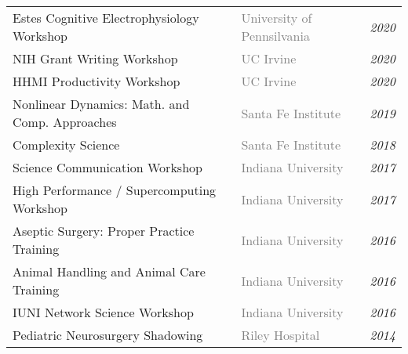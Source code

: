 \documentclass[10pt]{cooperCV2}
\begin{document}
\begin{longtable}{ l l @{\extracolsep{\fill}}  l @{}} 
	 
	Estes Cognitive Electrophysiology Workshop & \textcolor{grey}{University of Pennsilvania}  & \textit{2020} \\
	 
	NIH Grant Writing Workshop & \textcolor{grey}{UC Irvine}  & \textit{2020} \\
	 
	HHMI Productivity Workshop & \textcolor{grey}{UC Irvine}  & \textit{2020} \\
	 
	Nonlinear Dynamics: Math. and Comp. Approaches & \textcolor{grey}{Santa Fe Institute}  & \textit{2019} \\
	 
	Complexity Science & \textcolor{grey}{Santa Fe Institute}  & \textit{2018} \\
	 
	Science Communication Workshop & \textcolor{grey}{Indiana University}  & \textit{2017} \\
	 
	High Performance / Supercomputing Workshop & \textcolor{grey}{Indiana University}  & \textit{2017} \\
	 
	Aseptic Surgery: Proper Practice Training & \textcolor{grey}{Indiana University}  & \textit{2016} \\
	 
	Animal Handling and Animal Care Training & \textcolor{grey}{Indiana University}  & \textit{2016} \\
	 
	IUNI Network Science Workshop & \textcolor{grey}{Indiana University}  & \textit{2016} \\
	 
	Pediatric Neurosurgery Shadowing & \textcolor{grey}{Riley Hospital}  & \textit{2014} \\
	
\end{longtable}


















\end{document}
